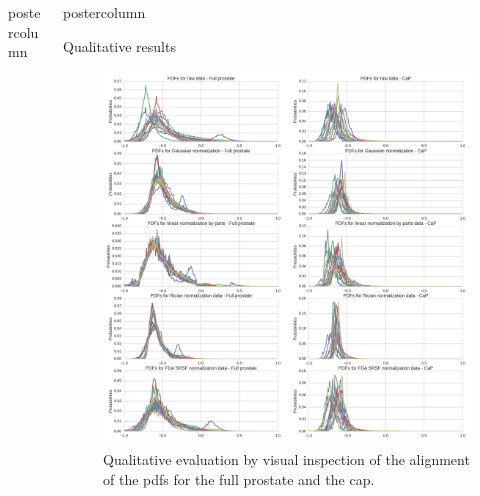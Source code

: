 \documentclass[final, size=a0]{beamer}
\newlength{\columnheight}
\begin{document}
\begin{frame}
\begin{columns}
\begin{column}{.33\textwidth}
\begin{beamercolorbox}[center,wd=\textwidth]{postercolumn}
\begin{minipage}[T]{.95\textwidth}
{          }         
        \end{minipage}
      \end{beamercolorbox}
    \end{column}
    \begin{column}{.33\textwidth}
      \begin{beamercolorbox}[center,wd=\textwidth]{postercolumn}
        \begin{minipage}[T]{.95\textwidth}  %
          \parbox[t][\columnheight]{\textwidth}{ %
            
            \begin{block}{Qualitative results}
              \begin{figure}
                \centering
                \includegraphics[width=1.\textwidth]{qualitative.png}
                \caption{Qualitative evaluation by visual inspection of the alignment of the \ac{pdf}s for the full prostate and the \ac{cap}.}
                \label{fig:qu}
              \end{figure}
              

\end{block}}
\end{minipage}
\end{beamercolorbox}
\end{column}
\end{columns}
\end{frame}
\end{document}
